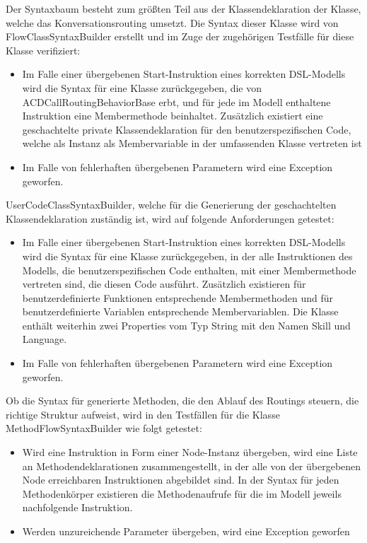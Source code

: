 Der Syntaxbaum besteht zum größten Teil aus der Klassendeklaration der Klasse, welche das Konversationsrouting umsetzt. Die Syntax dieser Klasse wird von FlowClassSyntaxBuilder erstellt und im Zuge der zugehörigen Testfälle für diese Klasse verifiziert:

\begin{itemize}
\item Im Falle einer übergebenen Start-Instruktion eines korrekten DSL-Modells wird die Syntax für eine Klasse zurückgegeben, die von ACDCallRoutingBehaviorBase erbt, und für jede im Modell enthaltene Instruktion eine Membermethode beinhaltet. Zusätzlich existiert eine geschachtelte private Klassendeklaration für den benutzerspezifischen Code, welche als Instanz als Membervariable in der umfassenden Klasse vertreten ist
\item Im Falle von fehlerhaften übergebenen Parametern wird eine Exception geworfen.
\end{itemize}

UserCodeClassSyntaxBuilder, welche für die Generierung der geschachtelten Klassendeklaration zuständig ist, wird auf folgende Anforderungen getestet:

\begin{itemize}
\item Im Falle einer übergebenen Start-Instruktion eines korrekten DSL-Modells wird die Syntax für eine Klasse zurückgegeben, in der alle Instruktionen des Modells, die benutzerspezifischen Code enthalten, mit einer Membermethode vertreten sind, die diesen Code ausführt. Zusätzlich existieren für benutzerdefinierte  Funktionen entsprechende Membermethoden und für benutzerdefinierte Variablen entsprechende Membervariablen. Die Klasse enthält weiterhin zwei Properties vom Typ String mit den Namen Skill und Language.
\item Im Falle von fehlerhaften übergebenen Parametern wird eine Exception geworfen.
\end{itemize}

Ob die Syntax für generierte Methoden, die den Ablauf des Routings steuern, die richtige Struktur aufweist, wird in den Testfällen für die Klasse MethodFlowSyntaxBuilder wie folgt getestet:

\begin{itemize}
\item Wird eine Instruktion in Form einer Node-Instanz übergeben, wird eine Liste an Methodendeklarationen zusammengestellt, in der alle von der übergebenen Node erreichbaren Instruktionen abgebildet sind. In der Syntax für jeden Methodenkörper existieren die Methodenaufrufe für die im Modell jeweils nachfolgende Instruktion.
\item Werden unzureichende Parameter übergeben, wird eine Exception geworfen
\end{itemize}

